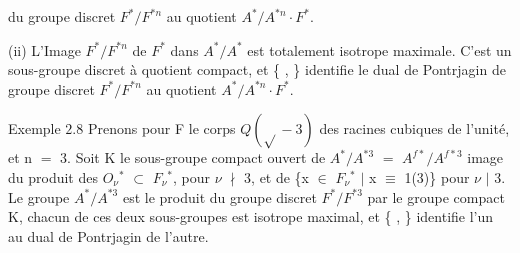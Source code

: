 \documentclass[10pt,a4paper]{article}
\begin{document}
\clearpage
{}
\label{d035-physical-015}
\par du groupe discret $F^*/F^{*n}$ au quotient $A^*/A^{*n}\cdot{}F^*$.\par
\par (ii) L'Image $F^*/F^{*n}$ de $F^*$ dans $A^*/A^*$ est totalement isotrope maximale. C'est un sous-groupe discret à quotient compact, et \{ , \} identifie le dual de Pontrjagin de groupe discret $F^*/F^{*n}$ au quotient $A^*/A^{*n}\cdot{}F^*$.\par
\par Exemple $2.8$ Prenons pour F le corps $Q(\sqrt{}-3)$ des racines cubiques de l'unité, et n $=$ 3. Soit K le sous-groupe compact ouvert de $A^*/A^{*3}$ $=$ $A^{f*}/A^{f*3}$ image du produit des $O_\nu{}^*$ $\subset{}$ $F_\nu{}^*$, pour $\nu{}$ $\nmid{}$ 3, et de \{x $\in{}$ $F_\nu{}^*$ $|$ x $\equiv{}$ 1(3)\} pour $\nu{}$ $|$ 3. Le groupe $A^*/A^{*3}$ est le produit du groupe discret $F^*/F^{*3}$ par le groupe compact K, chacun de ces deux sous-groupes est isotrope maximal, et \{ , \} identifie l'un au dual de Pontrjagin de l'autre.\par
\end{document}
